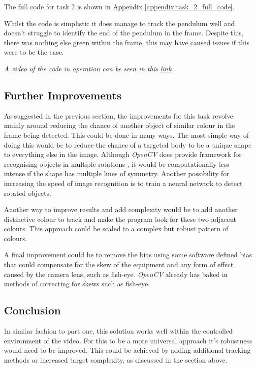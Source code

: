 \documentclass[conference]{IEEEtran}
\begin{document}
The full code for task 2 is shown in Appendix \ref{appendix:task_2_full_code}.

Whilst the code is simplistic it does manage to track the pendulum well and doesn't struggle to identify the end of the pendulum in the frame. Despite this, there was nothing else green within the frame, this may have caused issues if this were to be the case. 

\textit{A video of the code in operation can be seen in this \href{https://youtu.be/SP6NCaCyRWU}{link}}

\subsection{Further Improvements}

As suggested in the previous section, the improvements for this task revolve mainly around reducing the chance of another object of similar colour in the frame being detected. This could be done in many ways. The most simple way of doing this would be to reduce the chance of a targeted body to be a unique shape to everything else in the image. Although \textit{OpenCV} does provide framework for recognising objects in multiple rotations \cite{ref:object_orientation}, it would be computationally less intense if the shape has multiple lines of symmetry. Another possibility for increasing the speed of image recognition is to train a neural network to detect rotated objects. \cite{9578190} 

Another way to improve results and add complexity would be to add another distinctive colour to track and make the program look for these two adjacent colours. This approach could be scaled to a complex but robust pattern of colours. 

A final improvement could be to remove the bias using some software defined bias that could compensate for the skew of the equipment and any form of effect caused by the camera lens, such as fish-eye. \textit{OpenCV} already has baked in methods of correcting for skews such as fish-eye. \cite{ref:fish-eye}

\subsection{Conclusion}

In similar fashion to part one, this solution works well within the controlled environment of the video. For this to be a more universal approach it's robustness would need to be improved. This could be achieved by adding additional tracking methods or increased target complexity, as discussed in the section above.  
\end{document}

